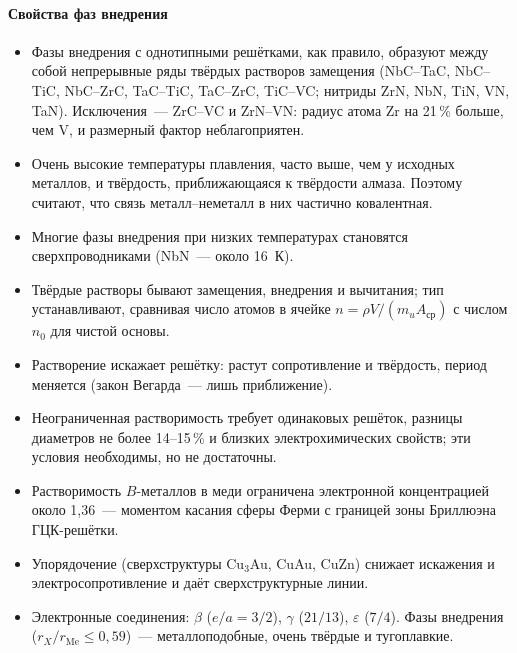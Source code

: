 \paragraph{Свойства фаз внедрения}
\begin{itemize}
\item Фазы внедрения с однотипными решётками, как правило, образуют между
собой непрерывные ряды твёрдых растворов замещения (NbC--TaC, NbC--TiC,
NbC--ZrC, TaC--TiC, TaC--ZrC, TiC--VC; нитриды ZrN, NbN, TiN, VN, TaN).
Исключения~— ZrC--VC и ZrN--VN: радиус атома Zr на 21\,\% больше, чем
V, и размерный фактор неблагоприятен.
\item Очень высокие температуры плавления, часто выше, чем у исходных
металлов, и твёрдость, приближающаяся к твёрдости алмаза. Поэтому
считают, что связь металл--неметалл в них частично ковалентная.
\item Многие фазы внедрения при низких температурах становятся
сверхпроводниками (NbN~— около 16~К).
\end{itemize}

\begin{itogi}
\begin{itemize}
\item Твёрдые растворы бывают замещения, внедрения и вычитания; тип
устанавливают, сравнивая число атомов в ячейке $n=\rho V/(m_uA_\text{ср})$
с числом $n_0$ для чистой основы.
\item Растворение искажает решётку: растут сопротивление и твёрдость,
период меняется (закон Вегарда~— лишь приближение).
\item Неограниченная растворимость требует одинаковых решёток, разницы
диаметров не более 14--15\,\% и близких электрохимических свойств; эти
условия необходимы, но не достаточны.
\item Растворимость $B$-металлов в меди ограничена электронной
концентрацией около 1,36~— моментом касания сферы Ферми с границей зоны
Бриллюэна ГЦК-решётки.
\item Упорядочение (сверхструктуры Cu$_3$Au, CuAu, CuZn) снижает
искажения и электросопротивление и даёт сверхструктурные линии.
\item Электронные соединения: $\beta$ ($e/a=3/2$), $\gamma$ ($21/13$),
$\varepsilon$ ($7/4$). Фазы внедрения ($r_X/r_\text{Me}\le0{,}59$)~—
металлоподобные, очень твёрдые и тугоплавкие.
\end{itemize}
\end{itogi}

